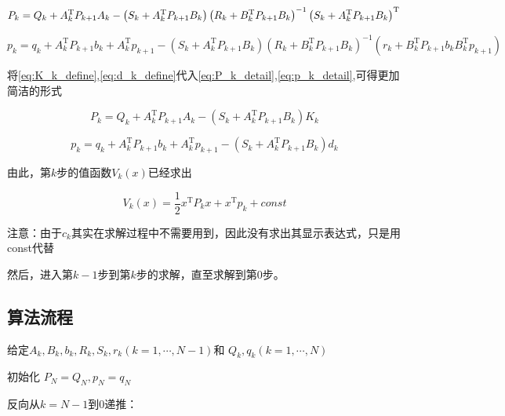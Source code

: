\documentclass[withoutpreface,bwprint]{NoteBook}
\begin{document}
\begin{equation}
\label{eq:P_k_detail}
P_k 
=Q_k 
+ A_k^\mathrm{T}P_{k+1}A_k 
- \left( S_k + A_k^\mathrm{T}P_{k+1}B_k \right) \left(R_k + B_k^\mathrm{T}P_{k+1}B_k \right)^{-1} \left( S_k + A_k^\mathrm{T}P_{k+1}B_k \right)^\mathrm{T} \\
\end{equation}

\begin{equation}
\label{eq:p_k_detail}
p_k
=q_k 
+ A_k^\mathrm{T} P_{k+1}b_k
+ A_k^\mathrm{T} p_{k+1}
- \left( S_k + A_k^\mathrm{T}P_{k+1}B_k \right) \left(R_k + B_k^\mathrm{T}P_{k+1}B_k \right)^{-1} \left( r_k + B_{k}^\mathrm{T}P_{k+1}b_{k} B_{k}^\mathrm{T}p_{k+1} \right)
\end{equation}


将\cref{eq:K_k_define},\cref{eq:d_k_define}代入\cref{eq:P_k_detail},\cref{eq:p_k_detail},可得更加简洁的形式

\begin{equation}
\label{eq:P_k_with_K_k}
P_k 
= Q_k 
+ A_k^\mathrm{T}P_{k+1}A_k 
- \left( S_k + A_k^\mathrm{T}P_{k+1}B_k \right) K_k 
\end{equation}

\begin{equation}
\label{eq:p_k_with_d_k}
p_k
= q_k 
+ A_k^\mathrm{T}P_{k+1}b_k
+ A_k^\mathrm{T} p_{k+1}
- \left( S_k + A_k^\mathrm{T}P_{k+1}B_k \right) d_k
\end{equation}

由此，第$k$步的值函数$V_{k}(x)$​已经求出

\begin{equation}
\label{eq:Value_func_k}
V_{k}(x) = \frac{1}{2}x^\mathrm{T} P_k x + x^\mathrm{T}p_k + const
\end{equation}


注意：由于$c_k$其实在求解过程中不需要用到，因此没有求出其显示表达式，只是用const代替

然后，进入第$k-1$步到第$k$步的求解，直至求解到第$0$步。



\subsection{算法流程}

给定$A_k,B_k,b_k,R_k,S_k,r_k (k=1,\cdots,N-1)$和 $Q_k,q_k (k=1,\cdots,N)$​

初始化 $P_N=Q_N,p_N = q_N$​

反向从$k=N-1$到$0$递推：
\end{document}
